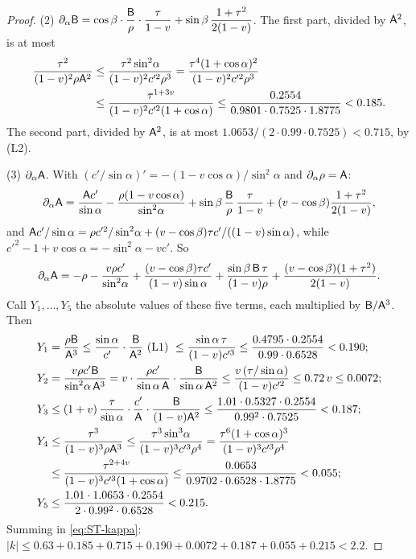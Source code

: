 \begin{proof}
(2) $\partial_\alpha\mathsf B=\cos\beta\cdot\dfrac{\mathsf B}\rho\cdot\dfrac\tau{1-v}+\sin\beta\,\dfrac{1+\tau^2}{2(1-v)}$. The first part,
divided by $\mathsf A^2$, is at most
\begin{align*}
\frac{\tau^2}{(1-v)^2\rho\mathsf A^2}&\le\frac{\tau^2\sin^2\!\alpha}{(1-v)^2c'^2\rho^3}=\frac{\tau^4(1+\cos\alpha)^2}{(1-v)^2c'^2\rho^3}\\
&\le\frac{\tau^{1+3v}}{(1-v)^2c'^2(1+\cos\alpha)}\le\frac{0.2554}{0.9801\cdot0.7525\cdot1.8775}<0.185 .
\end{align*}
The second part, divided by $\mathsf A^2$, is at most $1.0653/(2\cdot0.99\cdot0.7525)<0.715$, by (L2).

(3) $\partial_\alpha\mathsf A$. With $(c'/\sin\alpha)'=-(1-v\cos\alpha)/\sin^2\!\alpha$ and $\partial_\alpha\rho=\mathsf A$:
\[
\partial_\alpha\mathsf A=\frac{\mathsf A c'}{\sin\alpha}-\frac{\rho(1-v\cos\alpha)}{\sin^2\!\alpha}+\sin\beta\,\frac{\mathsf B}\rho\,\frac\tau{1-v}
+(v-\cos\beta)\frac{1+\tau^2}{2(1-v)},
\]
and $\mathsf A c'/\sin\alpha=\rho c'^2/\sin^2\!\alpha+(v-\cos\beta)\tau c'/((1-v)\sin\alpha)$, while
$c'^2-1+v\cos\alpha=-\sin^2\!\alpha-vc'$. So
\[
\partial_\alpha\mathsf A=-\rho-\frac{v\rho c'}{\sin^2\!\alpha}+\frac{(v-\cos\beta)\tau c'}{(1-v)\sin\alpha}
+\frac{\sin\beta\,\mathsf B\,\tau}{(1-v)\rho}+\frac{(v-\cos\beta)(1+\tau^2)}{2(1-v)} .
\]
Call $Y_1,\dots,Y_5$ the absolute values of these five terms, each multiplied by $\mathsf B/\mathsf A^3$. Then
\begin{align*}
Y_1&=\frac{\rho\STB}{\STA^3}\le\frac{\sin\alpha}{c'}\cdot\frac{\STB}{\STA^2}\ \text{(L1)}\ \le\frac{\sin\alpha\,\tau}{(1-v)c'^3}
\le\frac{0.4795\cdot0.2554}{0.99\cdot0.6528}<0.190;\\
Y_2&=\frac{v\rho c'\STB}{\sin^2\!\alpha\,\STA^3}=v\cdot\frac{\rho c'}{\sin\alpha\,\STA}\cdot\frac{\STB}{\sin\alpha\,\STA^2}
\le\frac{v\,(\tau/\sin\alpha)}{(1-v)c'^2}\le0.72\,v\le0.0072;\\
Y_3&\le(1+v)\,\frac\tau{\sin\alpha}\cdot\frac{c'}{\STA}\cdot\frac{\STB}{(1-v)\STA^2}
\le\frac{1.01\cdot0.5327\cdot0.2554}{0.99^2\cdot0.7525}<0.187;\\
Y_4&\le\frac{\tau^3}{(1-v)^3\rho\STA^3}\le\frac{\tau^3\sin^3\!\alpha}{(1-v)^3c'^3\rho^4}=\frac{\tau^6(1+\cos\alpha)^3}{(1-v)^3c'^3\rho^4}\\
&\le\frac{\tau^{2+4v}}{(1-v)^3c'^3(1+\cos\alpha)}\le\frac{0.0653}{0.9702\cdot0.6528\cdot1.8775}<0.055;\\
Y_5&\le\frac{1.01\cdot1.0653\cdot0.2554}{2\cdot0.99^2\cdot0.6528}<0.215 .
\end{align*}
Summing in \eqref{eq:ST-kappa}: $|k|\le0.63+0.185+0.715+0.190+0.0072+0.187+0.055+0.215<2.2$.


\end{proof}
